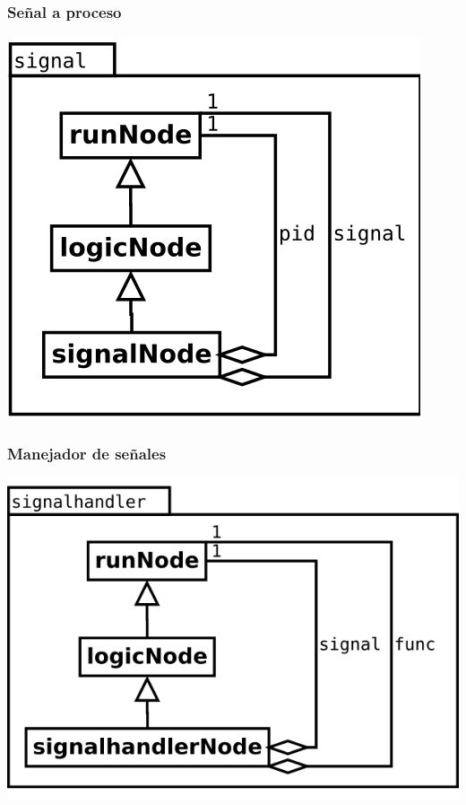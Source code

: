\begin{multicols}{2}
   \subsubsection {Señal a proceso} 
   \begin{center}
   \includegraphics[scale=0.4]{signal.png} \\
   \end{center}
\columnbreak
   \subsubsection {Manejador de señales} 
   \begin{center}
   \includegraphics[scale=0.4]{signalhandler.png} \\
   \end{center}
\end{multicols}


